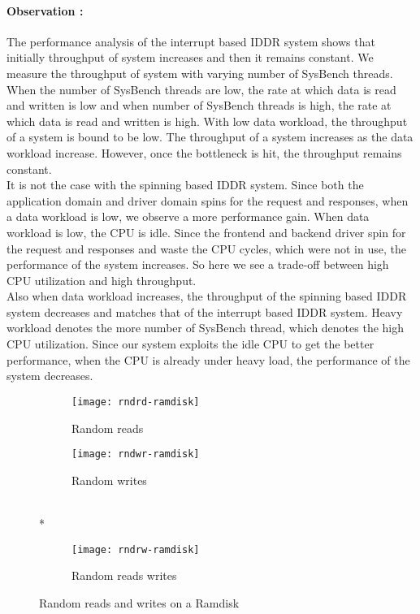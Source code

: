 \paragraph{Observation :}
The performance analysis of the interrupt based IDDR system shows that initially throughput of system increases and then it remains constant. We measure the throughput of system with varying number of SysBench threads. When the number of SysBench threads are low, the rate at which data is read and written is low and when number of SysBench threads is high, the rate at which data is read and written is high. With low data workload, the throughput of a system is bound to be low. The throughput of a system increases as the data workload increase. However, once the bottleneck is hit, the throughput remains constant.
\\[3mm]
It is not the case with the spinning based IDDR system. Since both the application domain and driver domain spins for the request and responses, when a data workload is low, we observe a more performance gain. When data workload is low, the CPU is idle. Since the frontend and backend driver spin for the request and responses and waste the CPU cycles, which were not in use, the performance of the system increases. So here we see a trade-off between high CPU utilization and high throughput. 
\\[3mm]
Also when data workload increases, the throughput of the spinning based IDDR system decreases and matches that of the interrupt based IDDR system. Heavy workload denotes the more number of SysBench thread, which denotes the high CPU utilization. Since our system exploits the idle CPU to get the better performance, when the CPU is already under heavy load, the performance of the system decreases.

\begin{figure}[!ht]
  \begin{subfigure}[b]{0.2\textwidth}
  \texttt{[image: rndrd-ramdisk]}
  \caption{Random reads}
  \label{subfig:rndrd-ramdisk}
  \end{subfigure}
  \hspace{50mm}
  \begin{subfigure}[b]{0.2\textwidth}
  \texttt{[image: rndwr-ramdisk]}
  \caption{Random writes}
  \label{subfig:rndwr-ramdisk}
  \end{subfigure}\\*
  \hspace{150mm}
  \begin{subfigure}[b]{0.3\textwidth}
  \texttt{[image: rndrw-ramdisk]}
  \caption{Random reads writes}
  \label{subfig:rndrw-ramdisk}
  \end{subfigure}
  \caption{Random reads and writes on a Ramdisk}\label{fig:rndramdisk}
\end{figure}


